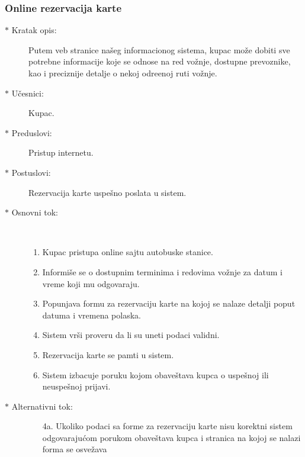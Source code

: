 \subsubsection{Online rezervacija karte}
\begin{description}
	\item [$\ast$ Kratak opis: ] Putem veb stranice na\v seg informacionog sistema, kupac mo\v ze dobiti sve potrebne informacije koje se odnose na red vo\v znje, dostupne prevoznike, kao i preciznije detalje o nekoj odre\dj{}enoj ruti vo\v znje.
	
	\item[$\ast$ U\v cesnici: ] Kupac.
	\item[$\ast$ Preduslovi: ] Pristup internetu.
	\item[$\ast$ Postuslovi: ] Rezervacija karte uspe\v sno poslata u sistem.
	\item[$\ast$ Osnovni tok: ] \ \\
	\renewcommand{\labelenumii}{\Roman{enumii}}
	\begin{enumerate}
		\item Kupac pristupa online sajtu autobuske stanice.
		\item Informi\v se se o dostupnim terminima i redovima vo\v znje za datum i vreme koji mu odgovaraju.
		\item Popunjava formu za rezervaciju karte na kojoj se nalaze detalji poput datuma i vremena polaska.
		\item Sistem vr\v si proveru da li su uneti podaci validni.
		\item Rezervacija karte se pamti u sistem.
		\item Sistem izbacuje poruku kojom obave\v stava kupca o uspe\v snoj ili neuspe\v snoj prijavi.
	\end{enumerate}
	\item[$\ast$ Alternativni tok: ]
	\begin{enumerate}
		\item[4a. ] Ukoliko podaci sa forme za rezervaciju karte nisu korektni sistem odgovaraju\'com porukom obave\v stava kupca i stranica na kojoj se nalazi forma se osve\v zava
	\end{enumerate}
	

\end{description}
